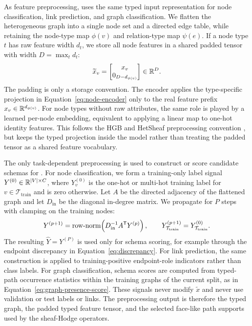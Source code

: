 As feature preprocessing, \method{} uses the same typed input representation for node classification, link prediction,
and graph classification.  We flatten the heterogeneous graph into a single node set and a
directed edge table, while retaining the node-type map \(\phi(v)\) and relation-type map
\(\psi(e)\).  If a node type \(t\) has raw feature width \(d_t\), we store all node features in a
shared padded tensor with width \(D=\max_t d_t\):
\begin{equation}
  \widetilde x_v
  =
  \begin{bmatrix}
    x_v \\ 0_{D-d_{\phi(v)}}
  \end{bmatrix}
  \in\mathbb{R}^D .
  \label{eq:typed-feature-padding}
\end{equation}
The padding is only a storage convention.  The encoder applies the type-specific projection in
Equation~\ref{eq:node-encoder} only to the real feature prefix \(x_v\in\mathbb{R}^{d_{\phi(v)}}\).  For
node types without raw attributes, the same role is played by a learned per-node embedding,
equivalent to applying a linear map to one-hot identity features.  This follows the HGB and
HetSheaf preprocessing convention \cite{lv2021hgb,braithwaite2024heterogeneous}, but keeps the
typed projection inside the model rather than treating the padded tensor as a shared feature
vocabulary.

The only task-dependent preprocessing is used to construct or score candidate schemas for
\ampss{}.  For node classification, we form a training-only label signal
\(Y^{(0)}\in\mathbb{R}^{|V|\times C}\), where \(Y^{(0)}_v\) is the one-hot or multi-hot training label for
\(v\in\mathcal{T}_{\mathrm{train}}\) and is zero otherwise.  Let \(A\) be the directed adjacency
of the flattened graph and let \(D_{\mathrm{in}}\) be the diagonal in-degree matrix.  We propagate
for \(P\) steps with clamping on the training nodes:
\begin{equation}
  Y^{(p+1)}
  =
  \operatorname{row\text{-}norm}
  \!\left(D_{\mathrm{in}}^{-1}A^{\mathsf{T}}Y^{(p)}\right),
  \qquad
  Y^{(p+1)}_{\mathcal{T}_{\mathrm{train}}}
  =
  Y^{(0)}_{\mathcal{T}_{\mathrm{train}}}.
  \label{eq:training-label-propagation}
\end{equation}
The resulting \(\widehat Y=Y^{(P)}\) is used only for schema scoring, for example through the
endpoint discrepancy in Equation~\ref{eq:discrepancy}.  For link prediction, the same construction
is applied to training-positive endpoint-role indicators rather than class labels.  For graph
classification, schema scores are computed from typed-path occurrence statistics within the
training graphs of the current split, as in Equation~\ref{eq:graph-presence-score}.  These
signals never modify \(\widetilde x\) and never use validation or test labels or links.  The
preprocessing output is therefore the typed graph, the padded typed feature tensor, and the
selected face-like path supports used by the sheaf-Hodge operators.

